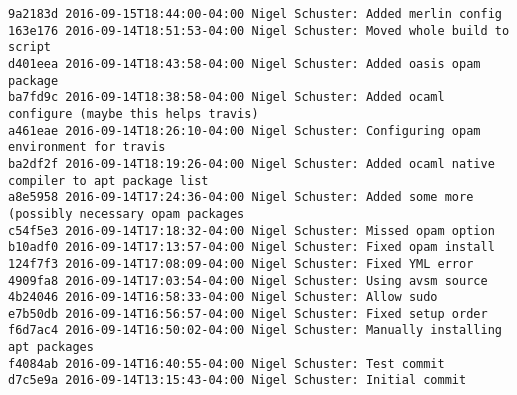 \begin{lstlisting}
9a2183d 2016-09-15T18:44:00-04:00 Nigel Schuster: Added merlin config
163e176 2016-09-14T18:51:53-04:00 Nigel Schuster: Moved whole build to script
d401eea 2016-09-14T18:43:58-04:00 Nigel Schuster: Added oasis opam package
ba7fd9c 2016-09-14T18:38:58-04:00 Nigel Schuster: Added ocaml configure (maybe this helps travis)
a461eae 2016-09-14T18:26:10-04:00 Nigel Schuster: Configuring opam environment for travis
ba2df2f 2016-09-14T18:19:26-04:00 Nigel Schuster: Added ocaml native compiler to apt package list
a8e5958 2016-09-14T17:24:36-04:00 Nigel Schuster: Added some more (possibly necessary opam packages
c54f5e3 2016-09-14T17:18:32-04:00 Nigel Schuster: Missed opam option
b10adf0 2016-09-14T17:13:57-04:00 Nigel Schuster: Fixed opam install
124f7f3 2016-09-14T17:08:09-04:00 Nigel Schuster: Fixed YML error
4909fa8 2016-09-14T17:03:54-04:00 Nigel Schuster: Using avsm source
4b24046 2016-09-14T16:58:33-04:00 Nigel Schuster: Allow sudo
e7b50db 2016-09-14T16:56:57-04:00 Nigel Schuster: Fixed setup order
f6d7ac4 2016-09-14T16:50:02-04:00 Nigel Schuster: Manually installing apt packages
f4084ab 2016-09-14T16:40:55-04:00 Nigel Schuster: Test commit
d7c5e9a 2016-09-14T13:15:43-04:00 Nigel Schuster: Initial commit

\end{lstlisting}
